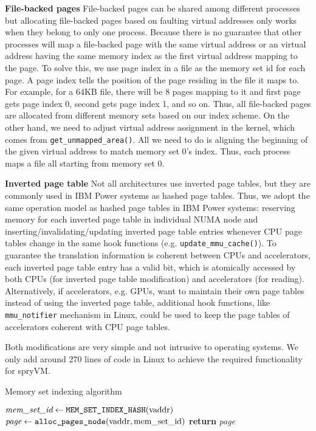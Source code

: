 \textbf{File-backed pages} File-backed pages can be shared among different processes but
allocating file-backed pages based on faulting virtual addresses only works when they belong to
only one process. Because there is no guarantee that other processes will map a file-backed page
with the same virtual address or an virtual address having the same memory index as the first
virtual address mapping to the page. To solve this, we use page index in a file as the memory set
id for each page. A page index tells the position of the page residing in the file it maps to.
For example, for a 64KB file, there will be 8 pages mapping to it and first page gets page index
0, second gets page index 1, and so on. Thus, all file-backed pages are allocated from different
memory sets based on our index scheme. On the other hand, we need to adjust virtual address 
assignment in the kernel, which comes from \verb|get_unmapped_area()|. All we need to do
is aligning the beginning of the given virtual address to match memory set 0's index. Thus,
each process maps a file all starting from memory set 0.


\textbf{Inverted page table} Not all architectures use inverted page tables, but they are commonly used in IBM Power systems as hashed page tables. Thus, we adopt the same operation model as hashed page tables in IBM Power systems: reserving memory for each inverted page table in individual NUMA node and inserting/invalidating/updating inverted page table entries whenever CPU page tables change in the same hook functions (e.g. \verb|update_mmu_cache()|). To guarantee the translation information is coherent between CPUs and accelerators, each inverted page table entry has a valid bit, which is atomically accessed by both CPUs (for inverted page table modification) and accelerators (for reading). Alternatively, if accelerators, e.g. GPUs, want to maintain their own page tables instead of using the inverted page table, additional hook functions, like  \verb|mmu_notifier| mechanism in Linux, could be used to keep the page tables of accelerators coherent with CPU page tables.

Both modifications are very simple and not intrusive to operating systems. We only add around 270 lines of code in Linux to achieve the required functionality for spryVM. 

\begin{algorithm}
  \caption{Memory set indexing algorithm}\label{alg:index}
  \begin{algorithmic}[1]
    \State $\textit{mem\_set\_id} \gets \verb|MEM_SET_INDEX_HASH|(\mbox{vaddr})$
    \State $\textit{page} \gets \verb|alloc_pages_node|(\mbox{vaddr}, \mbox{mem\_set\_id})$
    \State \textbf{return} \textit{page}
    \EndProcedure
  \end{algorithmic}
\end{algorithm}